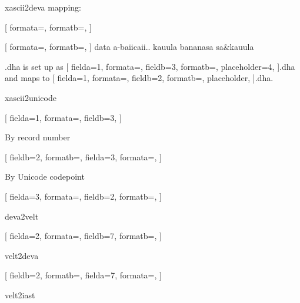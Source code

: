 \documentclass{article}
\begin{document}
xascii2deva mapping:

\setlength{\columnseprule}{0.4pt}
\begin{multicols}{4}
[
formata=,
formatb=\fdevb\Large,
]
\end{multicols}

[
formata=,
formatb=\fdevb,
]
{data a-baiicaii..  kauula bananasa sa\&kauula }

.dha is set up as 
[
fielda=1,
formata=,
fieldb=3,
formatb=\fdevb,%
placeholder=4,
]{.dha}
and maps to
[
fielda=1,
formata=,
fieldb=2,
formatb=\fdevb,
placeholder,
]{.dha}.


\newpage
xascii2unicode

[
fielda=1,
formata=,
fieldb=3,
]


\newpage
By record number


[
fieldb=2,
formatb=\fdevb\Large,
fielda=3,
formata=\small,
]



\newpage
By Unicode codepoint


[
fielda=3,
formata=\small,
fieldb=2,
formatb=\fdevb\huge\color{blue},
]

\newpage
deva2velt


\begin{multicols}{4}
[
fielda=2,
formata=\fdevb,
fieldb=7,
formatb=\small,
]
\end{multicols}

\newpage
velt2deva



\begin{multicols}{4}
[
fieldb=2,
formatb=\fdevb,
fielda=7,
formata=\small,
]
\end{multicols}


\newpage
velt2iast
\end{document}
